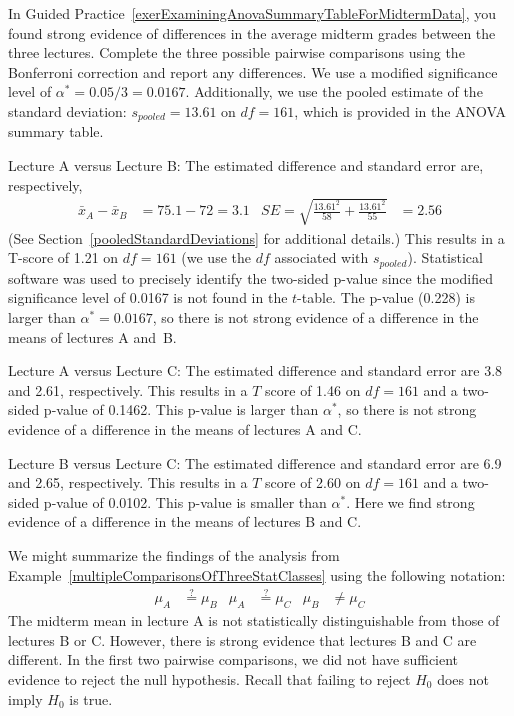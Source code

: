 \begin{examplewrap}
\begin{nexample}{In Guided Practice~\ref{exerExaminingAnovaSummaryTableForMidtermData}, you found strong evidence of differences in the average midterm grades between the three lectures. Complete the three possible pairwise comparisons using the Bonferroni correction and report any differences.} \label{multipleComparisonsOfThreeStatClasses}
We use a modified significance level of $\alpha^* = 0.05/3 = 0.0167$. Additionally, we use the pooled estimate of the standard deviation: $s_{pooled}=13.61$ on $df=161$, which is provided in the ANOVA summary table.

Lecture A versus Lecture B: The estimated difference and
standard error are, respectively,
\begin{align*}
\bar{x}_A - \bar{x}_{B} &= 75.1 - 72 = 3.1
	&SE = \sqrt{\frac{13.61^2}{58} + \frac{13.61^2}{55}} &= 2.56
\end{align*}
(See Section~\vref{pooledStandardDeviations} for additional
details.)
This results in a T-score of 1.21 on $df = 161$
(we use the $df$ associated with $s_{pooled}$).
Statistical software was used to precisely identify the two-sided
p-value since the modified significance level of 0.0167 is not
found in the $t$-table.
The p-value (0.228) is larger than $\alpha^*=0.0167$,
so there is not strong evidence of a difference in the means
of lectures A and~B.

Lecture A versus Lecture C: The estimated difference and standard error are 3.8 and 2.61, respectively. This results in a $T$ score of 1.46 on $df = 161$ and a two-sided p-value of 0.1462. This p-value is larger than $\alpha^*$, so there is not strong evidence of a difference in the means of lectures A and C.

Lecture B versus Lecture C: The estimated difference and standard error are 6.9 and 2.65, respectively. This results in a $T$ score of 2.60 on $df = 161$ and a two-sided p-value of 0.0102. This p-value is smaller than $\alpha^*$. Here we find strong evidence of a difference in the means of lectures B and C.
\end{nexample}
\end{examplewrap}

We might summarize the findings of the analysis from Example~\ref{multipleComparisonsOfThreeStatClasses} using the following notation:
\begin{align*}
\mu_A &\stackrel{?}{=} \mu_B
	&\mu_A &\stackrel{?}{=} \mu_C
	&\mu_B &\neq \mu_C
\end{align*}
The midterm mean in lecture A is not statistically distinguishable from those of lectures B or C. However, there is strong evidence that lectures B and C are different. In the first two pairwise comparisons, we did not have sufficient evidence to reject the null hypothesis. Recall that failing to reject $H_0$ does not imply $H_0$ is true.

